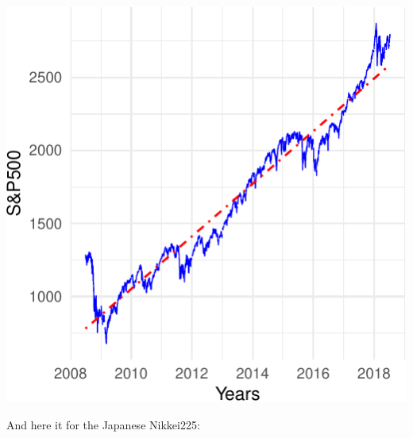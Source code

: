 \documentclass[11pt,]{article}
\begin{document}
\begin{center}\includegraphics{FMC_T4_PhD_Fin_Time_Series_files/figure-latex/SP500-1} \end{center}

And here it for the Japanese Nikkei225:
\end{document}
